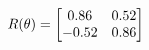 \documentclass[preview]{standalone}
\begin{document}
\begin{align*}
\special{dvisvgm:raw <g id='unique000'>}R(\theta) = \begin{bmatrix}0.86 & 0.52\\-0.52 & 0.86\end{bmatrix}\special{dvisvgm:raw </g>}
\end{align*}
\end{document}
